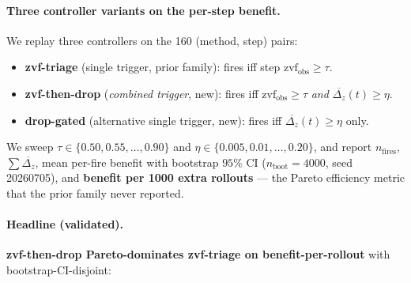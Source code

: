 \documentclass{article}
\begin{document}
\paragraph{Three controller variants on the per-step benefit.}
We replay three controllers on the 160 (method, step) pairs:

\begin{itemize}
\item \textbf{zvf-triage} (single trigger, prior family): fires iff step $\mathrm{zvf}_{\mathrm{obs}} \geq \tau$.
\item \textbf{zvf-then-drop} (\emph{combined trigger}, new): fires iff $\mathrm{zvf}_{\mathrm{obs}} \geq \tau$ \emph{and} $\overline{\Delta_z}(t) \geq \eta$.
\item \textbf{drop-gated} (alternative single trigger, new): fires iff $\overline{\Delta_z}(t) \geq \eta$ only.
\end{itemize}

We sweep $\tau \in \{0.50, 0.55, \ldots, 0.90\}$ and
$\eta \in \{0.005, 0.01, \ldots, 0.20\}$, and report
$n_{\mathrm{fires}}$, $\sum \overline{\Delta_z}$, mean per-fire benefit
with bootstrap $95\%$ CI ($n_{\mathrm{boot}}{=}4000$, seed 20260705),
and \textbf{benefit per 1000 extra rollouts} --- the Pareto
efficiency metric that the prior family never reported.

\paragraph{Headline (validated).}
\textbf{zvf-then-drop Pareto-dominates zvf-triage on benefit-per-rollout}
with bootstrap-CI-disjoint:
\end{document}
